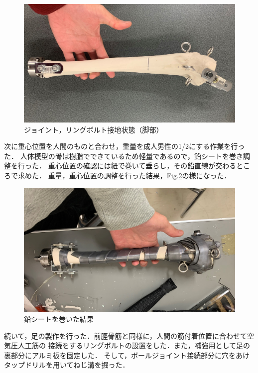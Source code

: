 \begin{figure}[h]
    \begin{center}
     \includegraphics[width=0.6\columnwidth,clip]{./2_measurement/legJoint.eps}
     \caption{ジョイント，リングボルト接地状態（脚部）}
     \label{fig:legJoint}
    \end{center}
\end{figure}
次に重心位置を人間のものと合わせ，重量を成人男性の1/2にする作業を行った．
人体模型の骨は樹脂でできているため軽量であるので，鉛シートを巻き調整を行った．
重心位置の確認には紐で巻いて垂らし，その鉛直線が交わるところで求めた．
重量，重心位置の調整を行った結果，Fig.\ref{fig:legPb}の様になった．

\begin{figure}[h]
    \begin{center}
     \includegraphics[width=0.6\columnwidth,clip]{./2_measurement/legPb.eps}
     \caption{鉛シートを巻いた結果}
     \label{fig:legPb}
    \end{center}
\end{figure}
\newpage
続いて，足の製作を行った．前脛骨筋と同様に，人間の筋付着位置に合わせて空気圧人工筋の
接続をするリングボルトの設置をした．また，補強用として足の裏部分にアルミ板を固定した．
そして，ボールジョイント接続部分に穴をあけタップドリルを用いてねじ溝を掘った．

